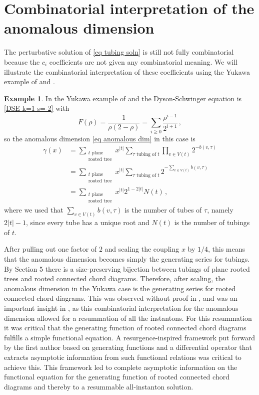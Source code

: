 \documentclass[oneside]{amsart}
\theoremstyle{definition}
\newtheorem{example}[thm]{Example}
\begin{document}
\section{Combinatorial interpretation of the anomalous dimension}

%

The perturbative solution of \eqref{eq tubing soln} is still not fully combinatorial because the $c_i$ coefficients are not given any combinatorial meaning. We will illustrate the combinatorial interpretation of these coefficients using the Yukawa example of \cite{bkerfc} and \cite{BD}.

\begin{example}\label{eg yukawa}
  In the Yukawa example of \cite{bkerfc} and \cite{BD} the Dyson-Schwinger equation is \eqref{DSE k=1 s=-2} with
  \[
  F(\rho) = \frac{1}{\rho(2-\rho)} = \sum_{i \geq 0} \frac{\rho^{i-1}}{2^{i+1}}\,,
  \]
  so the anomalous dimension \eqref{eq anomalous dim} in this case is
  \begin{align*} \gamma(x) & = \sum_{\substack{t \text{ plane }\\\text{rooted tree}}} x^{|t|} \sum_{\tau \text{ tubing of }t} \prod_{v\in V(t)} 2^{-b(v,\tau)} \\
 & = \sum_{\substack{t \text{ plane }\\\text{rooted tree}}} x^{|t|} \sum_{\tau \text{ tubing of }t} 2^{-\sum_{v \in V(t)}b(v,\tau)} \\
 & = \sum_{\substack{t \text{ plane }\\\text{rooted tree}}} x^{|t|}2^{1-2|t|} N(t)\,, \end{align*}
  where we used that $\sum_{v\in V(t)}b(v,\tau)$ is the number of tubes of $\tau$, namely $2|t|-1$, since every tube has a unique root and $N(t)$ is the number of tubings of $t$.

  After pulling out one factor of $2$ and scaling the coupling $x$ by $1/4$,
%
 this means that the anomalous dimension becomes simply the generating series for tubings.  By \cite{BCEFNOHY} Section 5 there is a size-preserving bijection between tubings of plane rooted trees and rooted connected chord diagrams.  Therefore, after scaling, the anomalous dimension in the Yukawa case is the generating series for rooted connected chord diagrams.  This was observed without proof in \cite{bk30}, and was an important insight in \cite{BD}, as this combinatorial interpretation for the anomalous dimension allowed for a resummation of all the instantons. For this resummation it was critical that the generating function of rooted connected chord diagrams fulfills a simple functional equation. A resurgence-inspired framework put forward by the first author based on generating functions and a differential operator that extracts asymptotic information from such functional relations \cite{Bgenfun} was critical to achieve this. 
This framework led to complete asymptotic information on the functional equation for the generating function of rooted connected chord diagrams and thereby to a resummable all-instanton solution.
%

\end{example}
\end{document}

